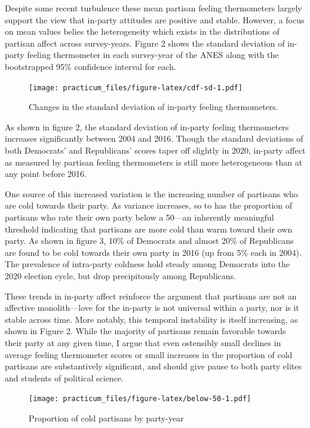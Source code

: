 \documentclass[
]{article}
\begin{document}
Despite some recent turbulence these mean partisan feeling thermometers largely support the view that in-party attitudes are positive and stable. However, a focus on mean values belies the heterogeneity which exists in the distributions of partisan affect across survey-years. Figure 2 shows the standard deviation of in-party feeling thermometer in each survey-year of the ANES along with the bootstrapped 95\% confidence interval for each.

\begin{figure}
\centering
\texttt{[image: practicum\_files/figure-latex/cdf-sd-1.pdf]}
\caption{\label{fig:cdf-sd}Changes in the standard deviation of in-party feeling thermometers.}
\end{figure}

As shown in figure 2, the standard deviation of in-party feeling thermometers increases significantly between 2004 and 2016. Though the standard deviations of both Democrats' and Republicans' scores taper off slightly in 2020, in-party affect as measured by partisan feeling thermometers is still more heterogeneous than at any point before 2016.

One source of this increased variation is the increasing number of partisans who are cold towards their party. As variance increases, so to has the proportion of partisans who rate their own party below a 50---an inherently meaningful threshold indicating that partisans are more cold than warm toward their own party. As shown in figure 3, 10\% of Democrats and almost 20\% of Republicans are found to be cold towards their own party in 2016 (up from 5\% each in 2004). The prevalence of intra-party coldness hold steady among Democrats into the 2020 election cycle, but drop precipitously among Republicans.

These trends in in-party affect reinforce the argument that partisans are not an affective monolith---love for the in-party is not universal within a party, nor is it stable across time. More notably, this temporal instability is itself increasing, as shown in Figure 2. While the majority of partisans remain favorable towards their party at any given time, I argue that even ostensibly small declines in average feeling thermometer scores or small increases in the proportion of cold partisans are substantively significant, and should give pause to both party elites and students of political science.

\begin{figure}
\centering
\texttt{[image: practicum\_files/figure-latex/below-50-1.pdf]}
\caption{\label{fig:below-50}Proportion of cold partisans by party-year}
\end{figure}
\end{document}
